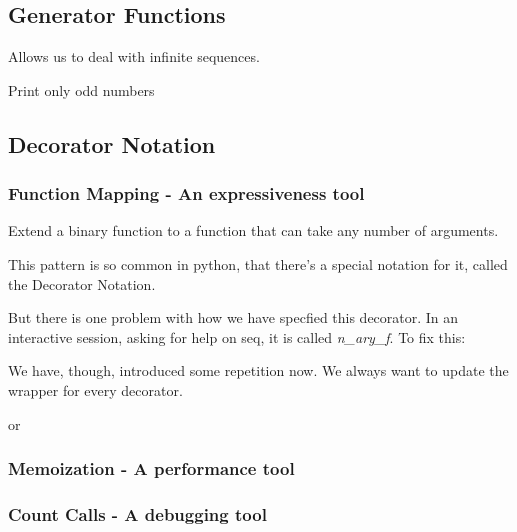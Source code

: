\documentclass[12pt]{article}
\begin{document}





\subsection{Generator Functions}

Allows us to deal with infinite sequences.



Print only odd numbers





\subsection{Decorator Notation}

\subsubsection{Function Mapping - An expressiveness tool}

Extend a binary function to a function that can take any number of arguments.



This pattern is so common in python, that there's a special notation for it, called the Decorator Notation.



But there is one problem with how we have specfied this decorator. In an interactive session, asking for help on seq, it is called \emph{n\_ary\_f}. To fix this:



We have, though, introduced some repetition now. We always want to update the wrapper for every decorator.



or






\subsubsection{Memoization - A performance tool}






\subsubsection{Count Calls - A debugging tool}
\end{document}
